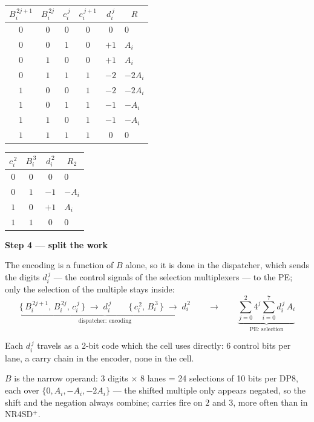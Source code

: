 \documentclass[fleqn]{article}
\begin{document}
\begin{center}
\renewcommand{\arraystretch}{1.2}
\begin{tabular}{c c c | c | c | l}
$B_i^{\,2j+1}$ & $B_i^{\,2j}$ & $c_i^{\,j}$ & $c_i^{\,j+1}$ & $d_i^{\,j}$ & \multicolumn{1}{c}{$R$} \\
\hline
$0$ & $0$ & $0$ & $0$ & $0$  & $0$ \\
$0$ & $0$ & $1$ & $0$ & $+1$ & $A_i$ \\
$0$ & $1$ & $0$ & $0$ & $+1$ & $A_i$ \\
$0$ & $1$ & $1$ & $1$ & $-2$ & $-2A_i$ \\
$1$ & $0$ & $0$ & $1$ & $-2$ & $-2A_i$ \\
$1$ & $0$ & $1$ & $1$ & $-1$ & $-A_i$ \\
$1$ & $1$ & $0$ & $1$ & $-1$ & $-A_i$ \\
$1$ & $1$ & $1$ & $1$ & $0$  & $0$ \\
\end{tabular}
\qquad\qquad
\begin{tabular}{c c | c | l}
$c_i^{\,2}$ & $B_i^{\,3}$ & $d_i^{\,2}$ & \multicolumn{1}{c}{$R_2$} \\
\hline
$0$ & $0$ & $0$  & $0$ \\
$0$ & $1$ & $-1$ & $-A_i$ \\
$1$ & $0$ & $+1$ & $A_i$ \\
$1$ & $1$ & $0$  & $0$ \\
\end{tabular}
\end{center}

\vspace{0.8em}

\noindent\textbf{Step 4 --- split the work}

\noindent The encoding is a function of $B$ alone, so it is done in the dispatcher, which
sends the digits $d_i^{\,j}$ --- the control signals of the selection multiplexers --- to the
PE; only the selection of the multiple stays inside:
\[
\underbrace{\bigl\{\, B_i^{\,2j+1},\, B_i^{\,2j},\, c_i^{\,j} \,\bigr\} \;\longrightarrow\; d_i^{\,j}
  \qquad
  \bigl\{\, c_i^{\,2},\, B_i^{\,3} \,\bigr\} \;\longrightarrow\; d_i^{\,2}}_{\textstyle \text{dispatcher: encoding}}
\qquad\longrightarrow\qquad
\underbrace{\sum_{j=0}^{2} 4^{j} \sum_{i=0}^{7} d_i^{\,j} \, A_i}_{\textstyle \text{PE: selection}}
\]

\noindent Each $d_i^{\,j}$ travels as a 2-bit code which the cell uses directly: 6 control
bits per lane, a carry chain in the encoder, none in the cell.

\vspace{0.8em}

\noindent $B$ is the narrow operand: 3 digits $\times$ 8 lanes = 24 selections of
10 bits per DP8, each over $\{0, A_i, -A_i, -2A_i\}$ --- the shifted multiple only appears
negated, so the shift and the negation always combine; carries fire on $2$ and $3$, more
often than in NR4SD$^{+}$.
\end{document}
